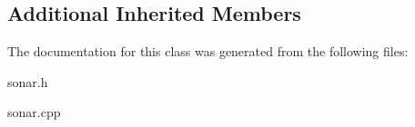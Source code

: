 \subsection*{Additional Inherited Members}


The documentation for this class was generated from the following files\+:\begin{DoxyCompactItemize}
\item 
sonar.\+h\item 
sonar.\+cpp\end{DoxyCompactItemize}
